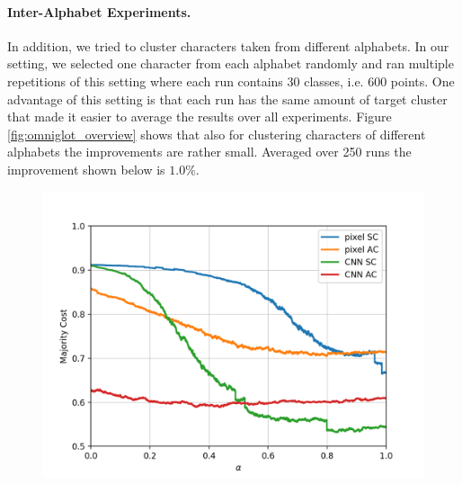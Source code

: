 \paragraph{Inter-Alphabet Experiments.} In addition, we tried to cluster characters taken from different alphabets. In our setting, we selected one character from each alphabet randomly and ran multiple repetitions of this setting where each run contains 30 classes, i.e. 600 points. One advantage of this setting is that each run has the same amount of target cluster that made it easier to average the results over all experiments. Figure \ref{fig:omniglot_overview} shows that also for clustering characters of different alphabets the improvements are rather small. Averaged over 250 runs the improvement shown below is $1.0\%$.

\begin{figure}[H]
  \centering
  \begin{minipage}{.45\textwidth}
  \centering
  {\includegraphics[width=\linewidth]{plots/omniglot_all}}
\end{minipage}\quad
\begin{minipage}{.45\textwidth}
  \centering

\end{minipage}
\end{figure}
